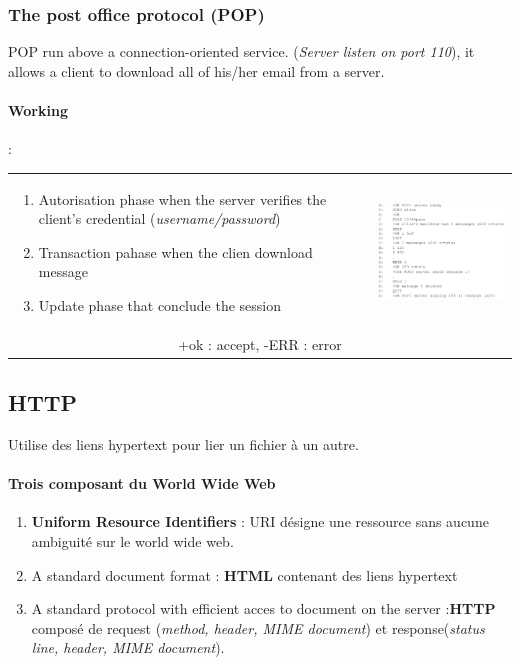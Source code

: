 \subsubsection{The post office protocol (POP) }
POP run above a connection-oriented service. (\textit{Server listen on port 110}), it allows a client to download all of his/her email from a server.

\paragraph{Working} :

\begin{tabular}{m{9cm}m{6cm}}
\begin{enumerate}
    \item Autorisation phase when the server verifies the client's credential 
        (\textit{username/password})
    \item Transaction pahase when the clien download message
    \item Update phase that conclude the session
\end{enumerate}
&
\includegraphics[width=7cm]{pop.png} \\
\multicolumn{2}{c}{+ok : accept, -ERR : error}
\end{tabular}


\subsection{HTTP}
Utilise des liens hypertext pour lier un fichier à un autre.

\paragraph{Trois composant du \textbf{World Wide Web}}
\begin{enumerate}
    \item \textbf{Uniform Resource Identifiers} : URI désigne une ressource sans aucune ambiguité
sur le world wide web.
    \item A standard document format : \textbf{HTML} contenant des liens hypertext
    \item A standard protocol with efficient acces to document on the server :\textbf{HTTP} composé de request (\textit{method, header, MIME document}) et response(\textit{status line, header, MIME document}).
\end{enumerate}


